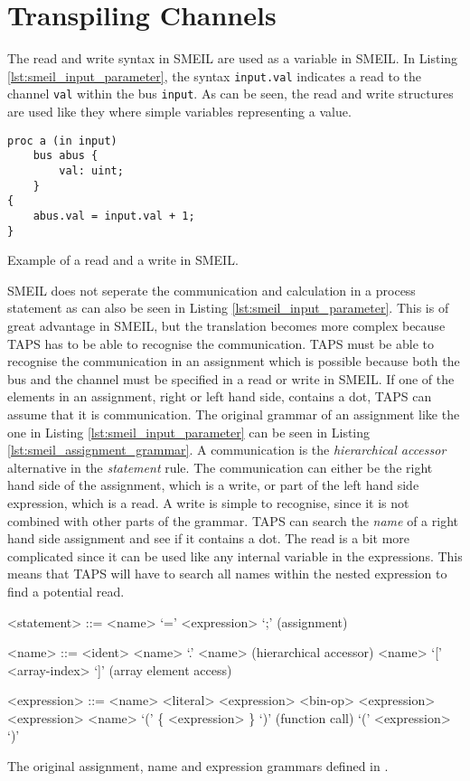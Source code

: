 \section{Transpiling Channels}
 The read and write syntax in SMEIL are used as a variable in SMEIL. In Listing \ref{lst:smeil_input_parameter}, the syntax \texttt{input.val} indicates a read to the channel \texttt{val} within the bus \texttt{input}. As can be seen, the read and write structures are used like they where simple variables representing a value.

\begin{listing}
\begin{verbatim}
proc a (in input)
    bus abus {
        val: uint;
    }
{
    abus.val = input.val + 1;
}
\end{verbatim}
\caption{Example of a read and a write in SMEIL.}
\label{lst:smeil_input_parameter}
\end{listing}
SMEIL does not seperate the communication and calculation in a process statement as can also be seen in Listing \ref{lst:smeil_input_parameter}. This is of great advantage in SMEIL, but the translation becomes more complex because TAPS has to be able to recognise the communication.
TAPS must be able to recognise the communication in an assignment which is possible because both the bus and the channel must be specified in a read or write in SMEIL. If one of the elements in an assignment, right or left hand side, contains a dot, TAPS can assume that it is communication. The original grammar of an assignment like the one in Listing \ref{lst:smeil_input_parameter} can be seen in Listing \ref{lst:smeil_assignment_grammar}. A communication is the \textit{hierarchical accessor} alternative in the \textit{statement} rule. The communication can either be the right hand side of the assignment, which is a write, or part of the left hand side expression, which is a read. A write is simple to recognise, since it is not combined with other parts of the grammar. TAPS can search the \textit{name} of a right hand side assignment and see if it contains a dot. The read is a bit more complicated since it can be used like any internal variable in the expressions. This means that TAPS will have to search all names within the nested expression to find a potential read.
\begin{listing}
\begin{grammar}
<statement> ::= <name> `=' <expression> `;' (assignment)

<name> ::= <ident>
\alt <name> `.' <name> (hierarchical accessor)
\alt <name> `[' <array-index> `]' (array element access)

<expression> ::= <name>
\alt <literal>
\alt <expression> <bin-op> <expression>
 <expression>
\alt <name> `(' \{ <expression> \}  `)' (function call)
\alt `(' <expression> `)'


\end{grammar}
\caption{The original assignment, name and expression grammars defined in \cite{Asheim2018}.}
\label{lst:smeil_assignment_grammar}
\end{listing}
